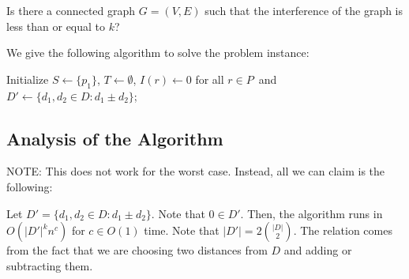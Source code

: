 \documentclass{article}
\begin{document}
Is there a connected graph $G = (V, E)$ such that the interference of the graph is less than or equal to $k$?
\newline

\noindent We give the following algorithm to solve the problem instance:
\newline

\begin{algorithm}[H]\label{alg:k_inter_min_1d}
	\SetAlgoLined
	\DontPrintSemicolon

	Initialize $S \gets \{p_1\}$, $T \gets \emptyset$, $I(r) \gets 0$ for all $r \in P$\, and $D' \gets \{d_1, d_2 \in D : d_1 \pm d_2\}$;


\end{algorithm}

\newpage
\subsection{Analysis of the Algorithm}

NOTE: This does not work for the worst case. Instead, all we can claim is the following:

Let $D' = \{ d_1, d_2 \in D : d_1 \pm d_2 \}$. Note that $0 \in D'$. Then, the algorithm runs in $O(|D'|^k n^c)$ for $c \in O(1)$ time. Note that $|D'| = 2\binom{|D|}{2}$. The relation comes from the fact that we are choosing two distances from $D$ and adding or subtracting them.
\end{document}
